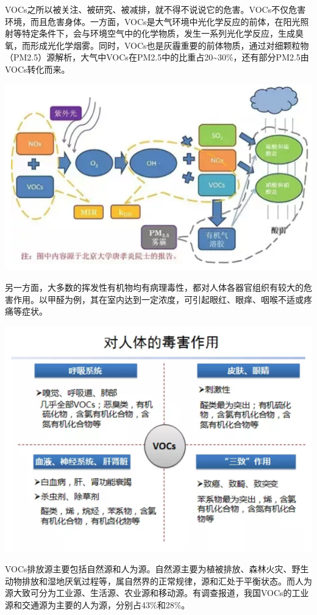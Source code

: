 \documentclass[]{book}
\begin{document}
VOCs之所以被关注、被研究、被减排，就不得不说说它的危害。VOCs不仅危害环境，而且危害身体。一方面，VOCs是大气环境中光化学反应的前体，在阳光照射等特定条件下，会与环境空气中的化学物质，发生一系列光化学反应，生成臭氧，而形成光化学烟雾。同时，VOCs也是灰霾重要的前体物质，通过对细颗粒物（PM2.5）源解析，大气中VOCs在PM2.5中的比重占20\textasciitilde{}30\%，还有部分PM2.5由VOCs转化而来。

\includegraphics[width=8.33in]{images/voc2}

另一方面，大多数的挥发性有机物均有病理毒性，都对人体各器官组织有较大的危害作用。以甲醛为例，其在室内达到一定浓度，可引起眼红、眼痒、咽喉不适或疼痛等症状。

\includegraphics[width=8.33in]{images/voc3}

VOCs排放源主要包括自然源和人为源。自然源主要为植被排放、森林火灾、野生动物排放和湿地厌氧过程等，属自然界的正常规律，源和汇处于平衡状态。而人为源大致可分为工业源、生活源、农业源和移动源。有调查报道，我国VOCs的工业源和交通源为主要的人为源，分别占43\%和28\%。
\end{document}
